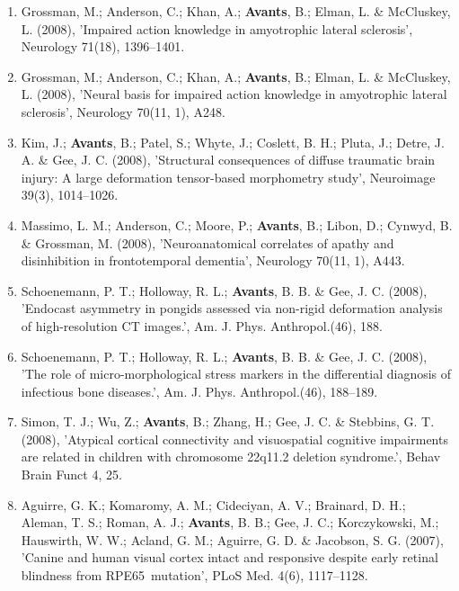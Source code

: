 \documentclass[11pt]{moderncv} %
\begin{document}
\begin{enumerate}
\item  Grossman, M.; Anderson, C.; Khan, A.; \textbf{Avants}, B.; Elman, L. \&  McCluskey, L. (2008), 'Impaired action knowledge in amyotrophic lateral sclerosis', Neurology 71(18), 1396--1401.

\item  Grossman, M.; Anderson, C.; Khan, A.; \textbf{Avants}, B.; Elman, L. \&  McCluskey, L. (2008), 'Neural basis for impaired action knowledge in amyotrophic lateral sclerosis', Neurology 70(11, 1), A248.

\item  Kim, J.; \textbf{Avants}, B.; Patel, S.; Whyte, J.; Coslett, B. H.; Pluta, J.; Detre, J. A. \&  Gee, J. C. (2008), 'Structural consequences of diffuse traumatic brain injury: A large deformation tensor-based morphometry study', Neuroimage 39(3), 1014--1026.

\item  Massimo, L. M.; Anderson, C.; Moore, P.; \textbf{Avants}, B.; Libon, D.; Cynwyd, B. \&  Grossman, M. (2008), 'Neuroanatomical correlates of apathy and disinhibition in frontotemporal dementia', Neurology 70(11, 1), A443.

\item  Schoenemann, P. T.; Holloway, R. L.; \textbf{Avants}, B. B. \&  Gee, J. C. (2008), 'Endocast asymmetry in pongids assessed via non-rigid deformation analysis of high-resolution CT images.', Am. J. Phys. Anthropol.(46), 188.

\item  Schoenemann, P. T.; Holloway, R. L.; \textbf{Avants}, B. B. \&  Gee, J. C. (2008), 'The role of micro-morphological stress markers in the differential diagnosis of infectious bone diseases.', Am. J. Phys. Anthropol.(46), 188--189.

\item  Simon, T. J.; Wu, Z.; \textbf{Avants}, B.; Zhang, H.; Gee, J. C. \&  Stebbins, G. T. (2008), 'Atypical cortical connectivity and visuospatial cognitive impairments are related in children with chromosome 22q11.2 deletion syndrome.', Behav Brain Funct 4, 25.

\item  Aguirre, G. K.; Komaromy, A. M.; Cideciyan, A. V.; Brainard, D. H.; Aleman, T. S.; Roman, A. J.; \textbf{Avants}, B. B.; Gee, J. C.; Korczykowski, M.; Hauswirth, W. W.; Acland, G. M.; Aguirre, G. D. \&  Jacobson, S. G. (2007), 'Canine and human visual cortex intact and responsive despite early retinal blindness from RPE65~mutation', PLoS Med. 4(6), 1117--1128.


\end{enumerate}
\end{document}
